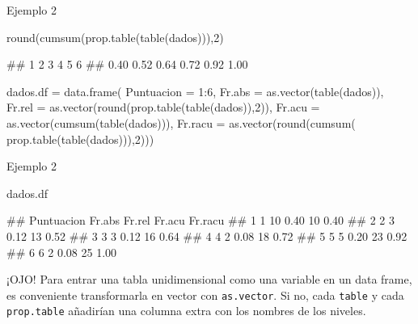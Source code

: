 \documentclass[
  ignorenonframetext,
  aspectratio=169]{beamer}
\newenvironment{Shaded}{\begin{snugshade}}{\end{snugshade}}
\newcommand{\AttributeTok}[1]{\textcolor[rgb]{0.77,0.63,0.00}{#1}}
\newcommand{\DecValTok}[1]{\textcolor[rgb]{0.00,0.00,0.81}{#1}}
\newcommand{\FunctionTok}[1]{\textcolor[rgb]{0.00,0.00,0.00}{#1}}
\newcommand{\NormalTok}[1]{#1}
\newcommand{\OtherTok}[1]{\textcolor[rgb]{0.56,0.35,0.01}{#1}}
\newcommand{\SpecialCharTok}[1]{\textcolor[rgb]{0.00,0.00,0.00}{#1}}
\let\oldverbatim\verbatim
\let\endoldverbatim\endverbatim
\renewenvironment{verbatim}{\tiny\oldverbatim}{\endoldverbatim}
\begin{document}
\begin{frame}[fragile]{Ejemplo 2}
\protect\hypertarget{ejemplo-2-4}{}
\begin{Shaded}
\begin{Highlighting}[]
\FunctionTok{round}\NormalTok{(}\FunctionTok{cumsum}\NormalTok{(}\FunctionTok{prop.table}\NormalTok{(}\FunctionTok{table}\NormalTok{(dados))),}\DecValTok{2}\NormalTok{)}
\end{Highlighting}
\end{Shaded}

\begin{verbatim}
##    1    2    3    4    5    6 
## 0.40 0.52 0.64 0.72 0.92 1.00
\end{verbatim}

\begin{Shaded}
\begin{Highlighting}[]
\NormalTok{dados.df }\OtherTok{=} \FunctionTok{data.frame}\NormalTok{(}
  \AttributeTok{Puntuacion =} \DecValTok{1}\SpecialCharTok{:}\DecValTok{6}\NormalTok{,}
  \AttributeTok{Fr.abs =} \FunctionTok{as.vector}\NormalTok{(}\FunctionTok{table}\NormalTok{(dados)),}
  \AttributeTok{Fr.rel =} \FunctionTok{as.vector}\NormalTok{(}\FunctionTok{round}\NormalTok{(}\FunctionTok{prop.table}\NormalTok{(}\FunctionTok{table}\NormalTok{(dados)),}\DecValTok{2}\NormalTok{)),}
  \AttributeTok{Fr.acu =} \FunctionTok{as.vector}\NormalTok{(}\FunctionTok{cumsum}\NormalTok{(}\FunctionTok{table}\NormalTok{(dados))),}
  \AttributeTok{Fr.racu =} \FunctionTok{as.vector}\NormalTok{(}\FunctionTok{round}\NormalTok{(}\FunctionTok{cumsum}\NormalTok{(}
    \FunctionTok{prop.table}\NormalTok{(}\FunctionTok{table}\NormalTok{(dados))),}\DecValTok{2}\NormalTok{)))}
\end{Highlighting}
\end{Shaded}
\end{frame}

\begin{frame}[fragile]{Ejemplo 2}
\protect\hypertarget{ejemplo-2-5}{}
\begin{Shaded}
\begin{Highlighting}[]
\NormalTok{dados.df}
\end{Highlighting}
\end{Shaded}

\begin{verbatim}
##   Puntuacion Fr.abs Fr.rel Fr.acu Fr.racu
## 1          1     10   0.40     10    0.40
## 2          2      3   0.12     13    0.52
## 3          3      3   0.12     16    0.64
## 4          4      2   0.08     18    0.72
## 5          5      5   0.20     23    0.92
## 6          6      2   0.08     25    1.00
\end{verbatim}

¡OJO! Para entrar una tabla unidimensional como una variable en un data
frame, es conveniente transformarla en vector con \texttt{as.vector}. Si
no, cada \texttt{table} y cada \texttt{prop.table} añadirían una columna
extra con los nombres de los niveles.
\end{frame}
\end{document}
